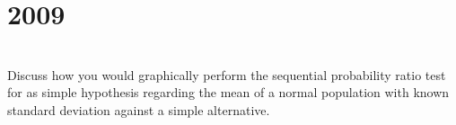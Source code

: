 \section*{2009}
\vspace{-.5cm}
\hrulefill \smallskip\\
 Discuss how you would graphically perform the sequential probability ratio test for as simple hypothesis regarding the mean of a normal population with known standard deviation against a simple alternative.